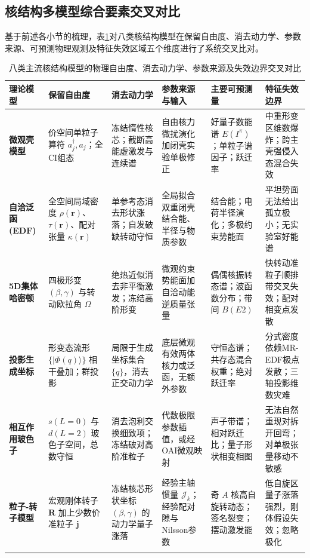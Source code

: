 \subsection{核结构多模型综合要素交叉对比}\label{sec:2-8-4}

基于前述各小节的梳理，表\ref{tab:2-8-cross-model-comparison}对八类核结构模型在保留自由度、消去动力学、参数来源、可预测物理观测及特征失效区域五个维度进行了系统交叉比对。

\begin{table}[htbp]
\centering
\small
\caption{八类主流核结构模型的物理自由度、消去动力学、参数来源及失效边界交叉对比}\label{tab:2-8-cross-model-comparison}
\begin{tabularx}{\textwidth}{p{2.0cm}p{2.6cm}p{2.6cm}p{2.8cm}p{2.8cm}X}
\toprule
\textbf{理论模型} & \textbf{保留自由度} & \textbf{消去动力学} & \textbf{参数来源与输入} & \textbf{主要可预测量} & \textbf{特征失效边界} \\ \midrule
\textbf{微观壳模型} & 价空间单粒子算符 $a^\dagger_j, a_j$；全CI组态 & 冻结惰性核芯；截断高能虚激发与连续谱 & 自由核力微扰演化加闭壳实验单极修正 & 好量子数能谱 $E(I^\pi)$；单粒子谱因子；跃迁率 & 中重形变区维数爆炸；跨主壳强侵入态混合失效 \\ \addlinespace
\textbf{自洽泛函 (EDF)} & 全空间局域密度 $\rho(\mathbf{r})$、$\tau(\mathbf{r})$、配对张量 $\kappa(\mathbf{r})$ & 单参考态消去形状涨落；自发破缺转动守恒 & 全局拟合双重闭壳结合能、半径与物质参数 & 结合能；电荷半径演化；多极约束势能面 & 平坦势面无法给出孤立极小；无实验室好能谱 \\ \addlinespace
\textbf{5D集体哈密顿} & 四极形变 $(\beta, \gamma)$ 与转动欧拉角 $\Omega$ & 绝热近似消去非平衡激发；冻结高阶形变 & 微观约束势能面加自洽动能逆质量张量 & 偶偶核振转态谱；波函数分布；带间 $B(E2)$ & 快转动准粒子顺排带交叉失效；配对相变点发散 \\ \addlinespace
\textbf{投影生成坐标} & 形变态流形 $\{|\Phi(q)\rangle\}$ 相干叠加；群投影 & 局限于生成坐标集合 $\{q\}$，消去正交动力学 & 底层微观有效两体核力或泛函，无额外参数 & 守恒态谱；共存态混合权重；绝对跃迁率 & 分式密度依赖MR-EDF极点发散；三轴投影维数灾难 \\ \addlinespace
\textbf{相互作用玻色子} & $s(L=0)$ 与 $d(L=2)$ 玻色子空间，总数守恒 & 消去泡利交换细致项；冻结破对高阶准粒子 & 代数极限参数插值，或经OAI微观映射 & 声子带谱；相对跃迁比；量子形状相变相图 & 无法自然重现对拆开回弯；对单极张量移动不敏感 \\ \addlinespace
\textbf{粒子-转子模型} & 宏观刚体转子 $\mathbf{R}$ 加上少数价准粒子 $\mathbf{j}$ & 冻结核芯形状坐标 $(\beta, \gamma)$ 的动力学量子涨落 & 经验主轴惯量 $\mathcal{J}_k$；经验配对隙与Nilsson参数 & 奇 $A$ 核高自旋转动态；签名裂变；摆动激发能 & 低自旋区量子涨落强烈，刚体假设失效；忽略极化 \\ \addlinespace

\end{tabularx}
\end{table}
